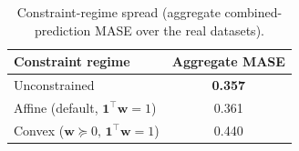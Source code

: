 \begin{table}[t]
\centering
\caption{Constraint-regime spread (aggregate combined-prediction MASE over the real datasets).}
\label{tab:constraint}
\small
\begin{tabular}{lc}
\toprule
Constraint regime & Aggregate MASE \\
\midrule
Unconstrained & \textbf{0.357} \\
Affine (default, $\mathbf{1}^{\!\top}\mathbf{w}{=}1$) & 0.361 \\
Convex ($\mathbf{w}\!\succeq\!0,\,\mathbf{1}^{\!\top}\mathbf{w}{=}1$) & 0.440 \\
\bottomrule
\end{tabular}
\end{table}
